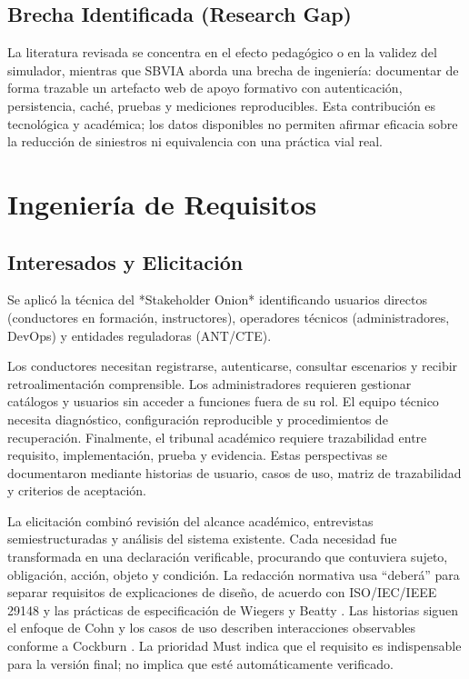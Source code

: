 \documentclass[11pt,a4paper]{report}
\begin{document}
\section{Brecha Identificada (Research Gap)}
La literatura revisada se concentra en el efecto pedagógico o en la validez del simulador, mientras que SBVIA aborda una brecha de ingeniería: documentar de forma trazable un artefacto web de apoyo formativo con autenticación, persistencia, caché, pruebas y mediciones reproducibles. Esta contribución es tecnológica y académica; los datos disponibles no permiten afirmar eficacia sobre la reducción de siniestros ni equivalencia con una práctica vial real.

\chapter{Ingeniería de Requisitos}
\section{Interesados y Elicitación}
Se aplicó la técnica del *Stakeholder Onion* identificando usuarios directos (conductores en formación, instructores), operadores técnicos (administradores, DevOps) y entidades reguladoras (ANT/CTE).

Los conductores necesitan registrarse, autenticarse, consultar escenarios y recibir retroalimentación comprensible. Los administradores requieren gestionar catálogos y usuarios sin acceder a funciones fuera de su rol. El equipo técnico necesita diagnóstico, configuración reproducible y procedimientos de recuperación. Finalmente, el tribunal académico requiere trazabilidad entre requisito, implementación, prueba y evidencia. Estas perspectivas se documentaron mediante historias de usuario, casos de uso, matriz de trazabilidad y criterios de aceptación.

La elicitación combinó revisión del alcance académico, entrevistas semiestructuradas y análisis del sistema existente. Cada necesidad fue transformada en una declaración verificable, procurando que contuviera sujeto, obligación, acción, objeto y condición. La redacción normativa usa ``deberá'' para separar requisitos de explicaciones de diseño, de acuerdo con ISO/IEC/IEEE 29148 y las prácticas de especificación de Wiegers y Beatty \cite{iso29148,wiegers2013software}. Las historias siguen el enfoque de Cohn y los casos de uso describen interacciones observables conforme a Cockburn \cite{cohn2004user,cockburn2001writing}. La prioridad Must indica que el requisito es indispensable para la versión final; no implica que esté automáticamente verificado.
\end{document}
